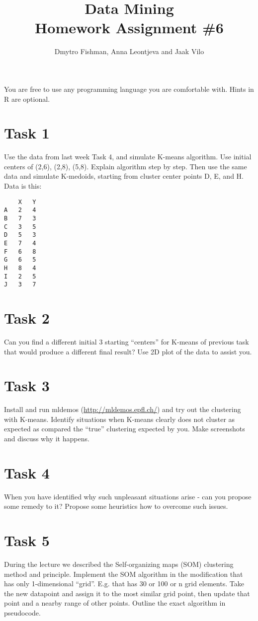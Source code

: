 \documentclass{article}
\title{Data Mining\\Homework Assignment \#6} %
\author{Dmytro Fishman, Anna Leontjeva and Jaak Vilo} %
\begin{document}
\maketitle %

You are free to use any programming language you are comfortable with. Hints in R are optional.

\section*{Task 1}
Use the data from last week Task 4, and simulate K-means algorithm. Use initial centers of (2,6), (2,8), (5,8). Explain algorithm step by step. Then use the same data and simulate K-medoids, starting from cluster center points D, E, and H. Data is this:
\begin{lstlisting}
	X	Y
A	2	4
B	7	3
C	3	5
D	5	3
E	7	4
F	6	8
G	6	5
H	8	4
I	2	5
J	3	7
\end{lstlisting}
\section*{Task 2}
Can you find a different initial 3 starting ``centers'' for K-means of previous task that would produce a different final result? Use 2D plot of the data to assist you.

\section*{Task 3}
Install and run mldemos (\url{http://mldemos.epfl.ch/}) and try out the clustering with K-means. Identify situations when K-means clearly does not cluster as expected as compared the “true” clustering expected by you. Make screenshots and discuss why it happens. 

\section*{Task 4}
When you have identified why such unpleasant situations arise - can you propose some remedy to it? Propose some heuristics how to overcome such issues.

\section*{Task 5}
During the lecture we described the Self-organizing maps (SOM) clustering method and principle. Implement the SOM algorithm in the modification that has only 1-dimensional ``grid''. E.g. that has 30 or 100 or n grid elements. Take the new datapoint and assign it to the most similar grid point, then update that point and a nearby range of other points. Outline the exact algorithm in pseudocode.
\end{document}
